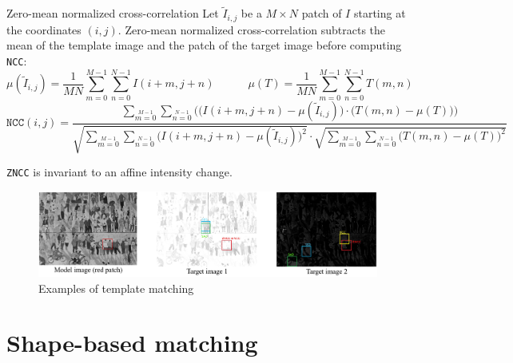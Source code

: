 \begin{descriptionlist}
    \item[Zero-mean normalized cross-correlation] 
        Let $\tilde{I}_{i,j}$ be a $M \times N$ patch of $I$ starting at the coordinates $(i, j)$.
        Zero-mean normalized cross-correlation subtracts the mean of the template image and the patch of the target image
        before computing \texttt{NCC}:
        \[ \mu(\tilde{I}_{i,j}) = \frac{1}{MN} \sum_{m=0}^{M-1} \sum_{n=0}^{N-1} I(i+m, j+n) \hspace{3em} \mu(T) = \frac{1}{MN} \sum_{m=0}^{M-1} \sum_{n=0}^{N-1} T(m, n) \]
        \[ 
            \texttt{NCC}(i, j) = 
            \frac{ \sum\limits_{m=0}\limits^{M-1} \sum\limits_{n=0}\limits^{N-1} \Big( \big(I(i+m, j+n) - \mu(\tilde{I}_{i,j})\big) \cdot \big(T(m, n) - \mu(T)\big) \Big) }
                { \sqrt{\sum\limits_{m=0}\limits^{M-1} \sum\limits_{n=0}\limits^{N-1} \big(I(i+m, j+n) - \mu(\tilde{I}_{i,j})\big)^2} \cdot \sqrt{\sum\limits_{m=0}\limits^{M-1} \sum\limits_{n=0}\limits^{N-1} \big(T(m, n) - \mu(T)\big)^2} } 
        \]

        \begin{remark}
            \texttt{ZNCC} is invariant to an affine intensity change.
        \end{remark}
\end{descriptionlist}

\begin{figure}[H]
    \centering
    \includegraphics[width=0.95\linewidth]{./img/template_matching_example.png}
    \caption{Examples of template matching}
\end{figure}



\section{Shape-based matching}

